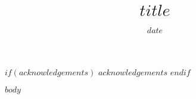 \documentclass[$if(fontsize)$$fontsize$,$endif$]{article}
\title{$title$}
\author{}
\date{$date$}
\theoremstyle{definition}
\theoremstyle{definition}
\theoremstyle{definition}
\theoremstyle{remark}
\begin{document}
\pagestyle{plain}
{\let\newpage\relax\maketitle}

$if(acknowledgements)$
  $acknowledgements$
$endif$

\pagestyle{norm}

$body$
\end{document}
